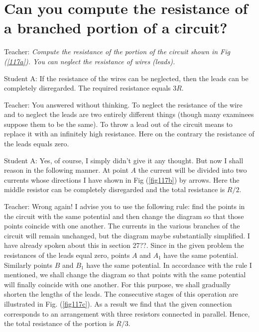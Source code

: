 \documentclass[a4paper,12pt]{book}
\begin{document}
\section{Can you compute the resistance of a branched portion of a circuit?}
{\sc Teacher:} \emph{Compute the resistance of the portion of the circuit shown in Fig (\ref{117a}). You can neglect the resistance of wires (leads).}

{\sc Student A:} If the resistance of the wires can be neglected, then the leads can be completely disregarded. The required resistance equals $3R$.

{\sc Teacher:} You answered without thinking. To neglect the resistance of the wire and to neglect the leads are two entirely different things (though many examinees suppose them to be the same). To throw a lead out of the circuit means to replace it with an infinitely high resistance. Here on the contrary the resistance of the leads equals zero.

{\sc Student A:} Yes, of course, I simply didn't give it any thought. But now I shall reason in the following manner. At point $A$ the current will be divided into two currents whose directions I have shown in Fig (\ref{fig117b}) by arrows. Here the middle resistor can be completely disregarded and the total resistance is $R/2$.

{\sc Teacher:} Wrong again! I advise you to use the following rule: find the points in the circuit with the same potential and then change the diagram so that those points coincide with one another. The currents in the various branches of the circuit will remain unchanged, but the diagram maybe substantially simplified. I have already spoken about this in section 27??. Since in the given problem the resistances of the leads equal zero, points $A$ and $A_1$ have the same potential. Similarly points $B$ and $B_1$ have the same potential. In accordance with the rule I mentioned, we shall change the diagram so that points with the same potential will finally coincide with one another. For this purpose, we shall gradually shorten the lengths of the leads. The consecutive stages of this operation are illustrated in Fig. (\ref{fig117c}). As a result we find that the given connection corresponds to an arrangement with three resistors connected in parallel. Hence, the total resistance of the portion is $R/3$. 
\end{document}
